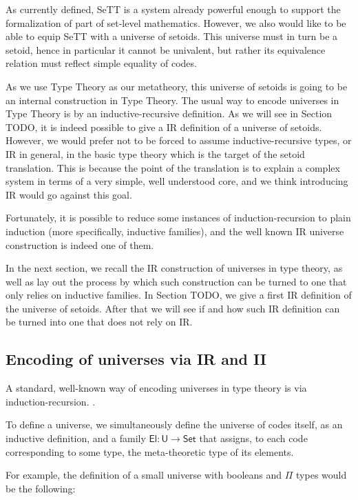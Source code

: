 \documentclass{easychair}
\newcommand{\Set}{\textsf{Set}}
\newcommand{\U}{\textsf{U}}
\newcommand{\El}{\textsf{El}}
\begin{document}
As currently defined, SeTT is a system already powerful enough to support the
formalization of part of set-level mathematics. However, we also would like to
be able to equip SeTT with a universe of setoids. This universe must in turn be
a setoid, hence in particular it cannot be univalent, but rather its equivalence
relation must reflect simple equality of codes.

As we use Type Theory as our metatheory, this universe of setoids is going to be
an internal construction in Type Theory. The usual way to encode universes in
Type Theory is by an inductive-recursive definition. As we will see in Section
TODO, it is indeed possible to give a IR definition of a universe of setoids.
%
However, we would prefer not to be forced to assume inductive-recursive types,
or IR in general, in the basic type theory which is the target of the setoid
translation. This is because the point of the translation is to explain a
complex system in terms of a very simple, well understood core, and we think
introducing IR would go against this goal.

Fortunately, it is possible to reduce some instances of induction-recursion to
plain induction (more specifically, inductive families), and the well known IR
universe construction is indeed one of them.

In the next section, we recall the IR construction of universes in type theory,
as well as lay out the process by which such construction can be turned to one
that only relies on inductive families. In Section TODO, we give a first IR
definition of the universe of setoids. After that we will see if and how such IR
definition can be turned into one that does not rely on IR.

\subsection{Encoding of universes via IR and II}

A standard, well-known way of encoding universes in type theory is via induction-recursion.
.

To define a universe, we simultaneously define the universe of codes itself, as
an inductive definition, and a family $\El : \U \to \Set$ that assigns, to each
code corresponding to some type, the meta-theoretic type of its elements.

For example, the definition of a small universe with booleans and $\Pi$ types
would be the following:
\end{document}
